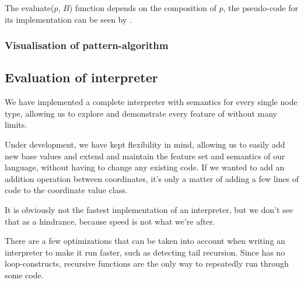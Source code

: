 The evaluate($p$, $B$) function depends on the composition of $p$, the pseudo-code for its implementation can be seen by .



\subsubsection{Visualisation of pattern-algorithm}
\label{sec:vispatternalg}


\subsection{Evaluation of interpreter}
We have implemented a complete interpreter with semantics for every
single node type, allowing us to explore and demonstrate every feature
of \productname{} without many limits.

Under development, we have kept flexibility in mind, allowing us to
easily add new base values and extend and maintain the feature set and
semantics of our language, without having to change any existing code.
If we wanted to add an addition operation between coordinates, it's only
a matter of adding a few lines of code to the coordinate value class.

It is obviously not the fastest implementation of an interpreter, but we
don't see that as a hindrance, because speed is not what we're after.

There are a few optimizations that can be taken into account when
writing an interpreter to make it run faster, such as detecting tail
recursion. Since \productname{} has no loop-constructs, recursive
functions are the only way to repeatedly run through some code.
